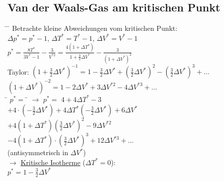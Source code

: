 \subsection{Van der Waals-Gas am kritischen Punkt}
\begin{tabbing}
\hspace{4em} \= \hspace{4em} \= \kill
Betrachte kleine Abweichungen vom kritischen Punkt:\\
$\Delta p^{*} = p^{*} - 1$, $\Delta T^{*} = T^{*} - 1$, $\Delta V^{*} = V^{*} - 1$\\
$p^{*} = \frac{8 T^{*}}{3V^{*} - 1} - \frac{3}{V^{*2}} = \frac{4 (1 + \Delta T^{*})}{1 + \frac{3}{2}\Delta V^{*}} - \frac{3}{(1 + \Delta V^{*})^2}$\\
Taylor:\>\> $(1 + \frac{3}{2}\Delta V^{*})^{-1} = 1 - \frac{3}{2} \Delta V^{*} + \left(\frac{3}{2} \Delta V^{*}\right)^2 - \left(\frac{3}{2}\Delta V^{*}\right)^3 + \dots$\\
\>\> $(1 + \Delta V^{*})^{-2} = 1 - 2 \Delta V^{*} + 3\Delta V^{*2} - 4 \Delta V^{*3} + \dots$\\
\hspace{4em} \= $p^{*} =$ \= \kill
$\rightarrow$\> $p^{*} =$\> $4 + 4\Delta T^{*} - 3$\\
\>$+ 4\cdot\left(-\frac{3}{2}\Delta V^{*}\right) + 4\Delta T^{*}\left(-\frac{3}{2}\Delta V^{*}\right) + 6\Delta V^{*}$\\
\> $+ 4(1+\Delta T^{*})(\frac{3}{2}\Delta V^{*})^2 - 9\Delta V^{*2}$\\
\> $- 4(1+\Delta T^{*})\cdot(\frac{3}{2}\Delta V^{*})^3 + 12 \Delta V^{*3} + \dots$\\
\>  (antisymmetrisch in $\Delta V^{*}$)\\
$\rightarrow$\> \underline{Kritische Isotherme} ($\Delta T^{*} = 0$): \\
\> $p^{*} = 1 - \frac{3}{2}\Delta V^{*}$
\end{tabbing}
\begin{figure}[H]
  \centering
\end{figure}

